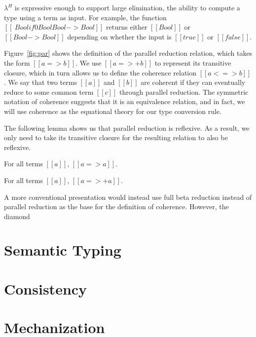 \documentclass[nonacm]{acmart}
\newcommand{\lang}{$\lambda^H$\xspace}
\begin{document}
\lang is expressive enough to support large
elimination, the ability to compute a type using a term as input. For
example, the function $[[\ Bool if 0 Bool Bool -> Bool]]$ returns
either $[[Bool]]$ or $[[Bool -> Bool]]$ depending on whether the input
is $[[true]]$ or $[[false]]$.

Figure~\ref{fig:par} shows the definition of the parallel reduction
relation, which takes the form $[[a => b]]$. We use $[[a =>+ b]]$ to
represent its transitive closure, which in turn allows us to define
the coherence relation $[[a <=> b]]$. %
We say that two terms $[[a]]$
and $[[b]]$ are coherent if they can eventually reduce to some common
term $[[c]]$ through parallel reduction. The symmetric notation of
coherence suggests that it is an equivalence relation, and in fact, we
will use coherence as the equational theory for our type conversion rule.

The following lemma shows us that parallel reduction is
reflexive. As a result, we only need to take its transitive closure
for the resulting relation to also be reflexive.
\begin{lemma}
  \label{lemma:parrefl}
  For all terms $[[a]]$, $[[a => a]]$.
\end{lemma}

\begin{lemma}
  \label{lemma:parsrefl}
  For all terms $[[a]]$, $[[a =>+ a]]$.
\end{lemma}




A more conventional presentation would instead use full beta reduction
instead of parallel reduction as the base for the definition of
coherence. However, the diamond

\section{Semantic Typing}
\label{sec:logreldep}

\section{Consistency}
\label{sec:logrelproof}

\section{Mechanization}
\label{sec:logrelmech}
\end{document}
